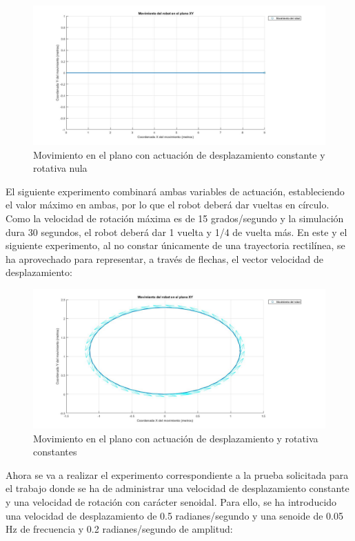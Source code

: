 \documentclass[a4paper,twoside]{article}
\begin{document}
	\begin{figure}[H]
		\centering
		\includegraphics[width=1\textwidth]{exp_MCD_1}
		\caption{Movimiento en el plano con actuación de desplazamiento constante y rotativa nula}
	\end{figure}

	El siguiente experimento combinará ambas variables de actuación, estableciendo el valor máximo en ambas, por lo que el robot deberá dar vueltas en círculo. Como la velocidad de rotación máxima es de 15 grados/segundo y la simulación dura 30 segundos, el robot deberá dar 1 vuelta y 1/4 de vuelta más. En este y el siguiente experimento, al no constar únicamente de una trayectoria rectilínea, se ha aprovechado para representar, a través de flechas, el vector velocidad de desplazamiento:
	
	\begin{figure}[H]
		\centering
		\includegraphics[width=1\textwidth]{exp_MCD_2}
		\caption{Movimiento en el plano con actuación de desplazamiento y rotativa constantes}
	\end{figure}

	Ahora se va a realizar el experimento correspondiente a la prueba solicitada para el trabajo donde se ha de administrar una velocidad de desplazamiento constante y una velocidad de rotación con carácter senoidal. Para ello, se ha introducido una velocidad de desplazamiento de 0.5 radianes/segundo y una senoide de 0.05 Hz de frecuencia y 0.2 radianes/segundo de amplitud:
	
\end{document}
